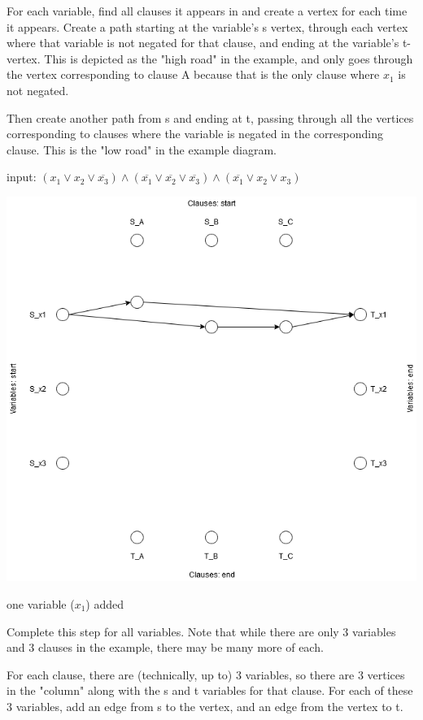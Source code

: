 \documentclass[a4paper]{article}
\begin{document}
For each variable, find all clauses it appears in and create a vertex for each time it appears. Create a path starting at the variable's s vertex, through each vertex where that variable is not negated for that clause, and ending at the variable's t-vertex. This is depicted as the "high road" in the example, and only goes through the vertex corresponding to clause A because that is the only clause where $x_1$ is not negated.

Then create another path from s and ending at t, passing through all the vertices corresponding to clauses where the variable is negated in the corresponding clause. This is the "low road" in the example diagram.

input: $(x_1 \vee x_2 \vee \overline{x_3}) \wedge (\overline{x_1} \vee \overline{x_2} \vee \overline{x_3}) \wedge (\overline{x_1} \vee x_2 \vee x_3)$ 

\begin{center}
    \includegraphics[scale=.5]{hw11-1var.png}
    
    \caption{one variable ($x_1$) added}
\end{center}

Complete this step for all variables. Note that while there are only 3 variables and 3 clauses in the example, there may be many more of each.

For each clause, there are (technically, up to) 3 variables, so there are 3 vertices in the "column" along with the s and t variables for that clause. For each of these 3 variables, add an edge from s to the vertex, and an edge from the vertex to t.
\end{document}

